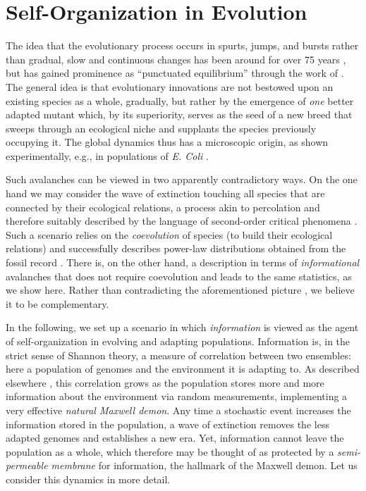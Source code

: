 \documentclass[letterpaper]{article}
\begin{document}
\section{Self-Organization in Evolution}

The idea that the evolutionary process occurs in spurts, jumps, and
bursts rather than gradual, slow and continuous changes has been
around for over 75 years \citep{WIL}, but has gained prominence as
``punctuated equilibrium'' through the work of \citet{GE77,GE93}. The
general idea is that evolutionary innovations are not bestowed upon an
existing species as a whole, gradually, but rather by the emergence of
{\em one} better adapted mutant which, by its superiority, serves as
the seed of a new breed that sweeps through an ecological niche and
supplants the species previously occupying it. The global dynamics
thus has a microscopic origin, as shown experimentally, e.g., in
populations of {\it E. Coli} \citep{ECL96}.

Such avalanches can be viewed in two apparently contradictory ways. On
the one hand we may consider the wave of extinction touching all
species that are connected by their ecological relations, a process
akin to percolation and therefore suitably described by the language
of second-order critical phenomena \citep{BS}. Such a scenario relies
on the {\em coevolution} of species (to build their ecological
relations) and successfully describes power-law distributions obtained
from the fossil record \citep{SB96,BP96}. There is, on the other hand,
a description in terms of {\em informational} avalanches that does not
require coevolution and leads to the same statistics, as we show
here. Rather than contradicting the aforementioned picture
\citep{NFST}, we believe it to be complementary.

In the following, we set up a scenario in which {\em information} is
viewed as the agent of self-organization in evolving and adapting
populations. Information is, in the strict sense of Shannon theory, a
measure of correlation between two ensembles: here a population of
genomes and the environment it is adapting to. As described elsewhere
\citep{IAL}, this correlation grows as the population stores more and
more information about the environment via random measurements,
implementing a very effective {\em natural Maxwell demon}. Any time a
stochastic event increases the information stored in the population, a
wave of extinction removes the less adapted genomes and establishes a
new era. Yet, information cannot leave the population as a whole,
which therefore may be thought of as protected by a {\em
semi-permeable membrane} for information, the hallmark of the Maxwell
demon. Let us consider this dynamics in more detail.
\end{document}
